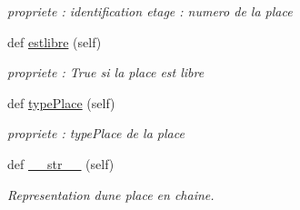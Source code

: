\begin{DoxyCompactItemize}
\begin{DoxyCompactList}\small\item\em propriete \+: identification etage \+: numero de la place \end{DoxyCompactList}\item 
\hypertarget{classm_1_1_parking_1_1_place_ad4070ee036772707e4a960814bbdd467}{}def \hyperlink{classm_1_1_parking_1_1_place_ad4070ee036772707e4a960814bbdd467}{estlibre} (self)\label{classm_1_1_parking_1_1_place_ad4070ee036772707e4a960814bbdd467}

\begin{DoxyCompactList}\small\item\em propriete \+: True si la place est libre \end{DoxyCompactList}\item 
\hypertarget{classm_1_1_parking_1_1_place_aee4b8251c58b7381864831973370b242}{}def \hyperlink{classm_1_1_parking_1_1_place_aee4b8251c58b7381864831973370b242}{type\+Place} (self)\label{classm_1_1_parking_1_1_place_aee4b8251c58b7381864831973370b242}

\begin{DoxyCompactList}\small\item\em propriete \+: type\+Place de la place \end{DoxyCompactList}\item 
\hypertarget{classm_1_1_parking_1_1_place_a24f2b7db82b7e0e2b4a9102db0e51c07}{}def \hyperlink{classm_1_1_parking_1_1_place_a24f2b7db82b7e0e2b4a9102db0e51c07}{\+\_\+\+\_\+str\+\_\+\+\_\+} (self)\label{classm_1_1_parking_1_1_place_a24f2b7db82b7e0e2b4a9102db0e51c07}

\begin{DoxyCompactList}\small\item\em Representation d\textquotesingle{}une place en chaine. \end{DoxyCompactList}\end{DoxyCompactItemize}
